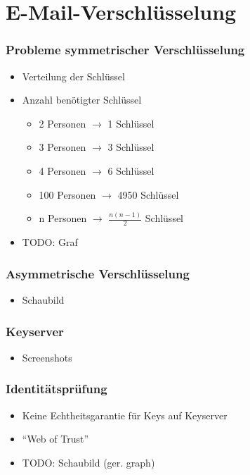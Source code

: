 \section{E-Mail-Verschlüsselung}

\begin{frame}
  \frametitle{Probleme symmetrischer Verschlüsselung}
  \begin{itemize}
    \item Verteilung der Schlüssel
    \item Anzahl benötigter Schlüssel
    \begin{itemize}
      \item 2 Personen $\rightarrow$ 1 Schlüssel
      \item 3 Personen $\rightarrow$ 3 Schlüssel
      \item 4 Personen $\rightarrow$ 6 Schlüssel
      \item 100 Personen $\rightarrow$ 4950 Schlüssel
      \item n Personen $\rightarrow$ $\frac{n(n-1)}{2}$ Schlüssel
    \end{itemize}
    \item TODO: Graf
  \end{itemize}

\end{frame}

\begin{frame}
   \frametitle{Asymmetrische Verschlüsselung} 
   \begin{itemize}
     \item Schaubild
   \end{itemize}
\end{frame}

\begin{frame}
  \frametitle{Keyserver}
  \begin{itemize}
    \item Screenshots
  \end{itemize}
\end{frame}

\begin{frame}
  \frametitle{Identitätsprüfung}
  \begin{itemize}
    \item Keine Echtheitsgarantie für Keys auf Keyserver
    \item ``Web of Trust''
    \item TODO: Schaubild (ger. graph)
  \end{itemize}
\end{frame}

